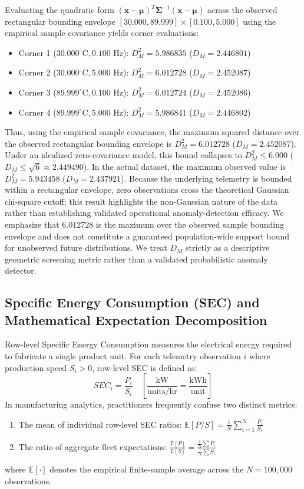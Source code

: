 \documentclass[journal]{IEEEtran}
\begin{document}
Evaluating the quadratic form $(\mathbf{x} - \boldsymbol{\mu})^T \mathbf{\Sigma}^{-1} (\mathbf{x} - \boldsymbol{\mu})$ across the observed rectangular bounding envelope $[30.000, 89.999] \times [0.100, 5.000]$ using the empirical sample covariance yields corner evaluations:
\begin{itemize}
    \item Corner 1 ($30.000^\circ\text{C}, 0.100\text{ Hz}$): $D_M^2 = 5.986835$ ($D_M = 2.446801$)
    \item Corner 2 ($30.000^\circ\text{C}, 5.000\text{ Hz}$): $D_M^2 = 6.012728$ ($D_M = 2.452087$)
    \item Corner 3 ($89.999^\circ\text{C}, 0.100\text{ Hz}$): $D_M^2 = 6.012724$ ($D_M = 2.452086$)
    \item Corner 4 ($89.999^\circ\text{C}, 5.000\text{ Hz}$): $D_M^2 = 5.986841$ ($D_M = 2.446802$)
\end{itemize}
Thus, using the empirical sample covariance, the maximum squared distance over the observed rectangular bounding envelope is $D_M^2 = 6.012728$ ($D_M = 2.452087$). Under an idealized zero-covariance model, this bound collapses to $D_M^2 \le 6.000$ ($D_M \le \sqrt{6} \approx 2.449490$). In the actual dataset, the maximum observed value is $D_M^2 = 5.943458$ ($D_M = 2.437921$). Because the underlying telemetry is bounded within a rectangular envelope, zero observations cross the theoretical Gaussian chi-square cutoff; this result highlights the non-Gaussian nature of the data rather than establishing validated operational anomaly-detection efficacy. We emphasize that $6.012728$ is the maximum over the observed sample bounding envelope and does not constitute a guaranteed population-wide support bound for unobserved future distributions. We treat $D_M$ strictly as a descriptive geometric screening metric rather than a validated probabilistic anomaly detector.

\subsection{Specific Energy Consumption (SEC) and Mathematical Expectation Decomposition}
Row-level Specific Energy Consumption measures the electrical energy required to fabricate a single product unit. For each telemetry observation $i$ where production speed $S_i > 0$, row-level SEC is defined as:
\begin{equation}
SEC_i = \frac{P_i}{S_i} \quad \left[ \frac{\text{kW}}{\text{units/hr}} = \frac{\text{kWh}}{\text{unit}} \right]
\end{equation}
In manufacturing analytics, practitioners frequently confuse two distinct metrics:
\begin{enumerate}
    \item The mean of individual row-level SEC ratios: $\mathbb{E}[P/S] = \frac{1}{N}\sum_{i=1}^N \frac{P_i}{S_i}$
    \item The ratio of aggregate fleet expectations: $\frac{\mathbb{E}[P]}{\mathbb{E}[S]} = \frac{\frac{1}{N}\sum P_i}{\frac{1}{N}\sum S_i}$
\end{enumerate}
where $\mathbb{E}[\cdot]$ denotes the empirical finite-sample average across the $N = 100{,}000$ observations.
\end{document}
